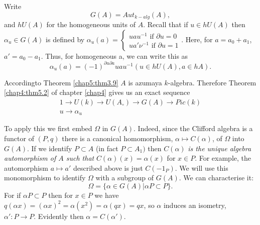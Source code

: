 Write
$$
G(A) = Aut_{k-alg} (A), 
$$
and $hU(A)$ for the homogeneous units of $A$. Recall that if $u \in h
U(A)$ then $\alpha_u \in G(A)$ is defined by $\alpha_u (a) =  
\begin{cases} 
ua u^{-1} \text{ if } \partial u = 0\\ 
ua' \nu^{-1} \text{ if } \partial u = 1
\end{cases}$. Here, for $a = a_0 + a_1$, $a' = a_0 - a_1$. Thus, for
homogeneous a, we can write this as  
$$
\alpha_u (a) = (-1)^{\partial u \partial a} u a u^{-1} (u \in h U (A),
a \in hA). 
$$

According\pageoriginale to Theorem \ref{chap5:thm3.9} $A$ is azumaya
$k$-algebra. Therefore Theorem \ref{chap4:thm5.2} of chapter
\ref{chap4} gives us an exact sequence   
\begin{gather*}
1 \to U (k) \to U (A_\circ) \to G(A) \to Pic (k)\tag{4.2}\label{eq4.2}\\ 
u \rightarrow \alpha_u 
\end{gather*}

To apply this we first embed $\Omega$ in $G(A)$. Indeed, since the
Clifford algebra is a functor of $(P, q)$ there is a canonical
homomorphism, $\alpha \mapsto C(\alpha)$, of $\Omega$ into $G(A)$. If
we identify $P \subset A$ (in fact $P \subset A_1)$ then $C(\alpha)$
\textit{is the unique algebra automorphism of $A$ such that}
$C(\alpha)(x) = \alpha(x)$ for $x \in P$. For example, the
automorphism $a \mapsto a'$ described above is just $C(-1_P)$. We
will use this monomorphism to identify $\Omega$ with a subgroup of
$G(A)$. We can characterise it: 
$$
\Omega = \{\alpha \in G(A) \big| \alpha P \subset P\}. 
$$
For if $\alpha P \subset P$ then for $x \in P$ we have
$q(\alpha x) = (\alpha x)^2 = \alpha (x^2) = \alpha (qx) = qx$, so
$\alpha $ induces an isometry, $\alpha': P \to P$. Evidently then
$\alpha = C(\alpha')$.  

